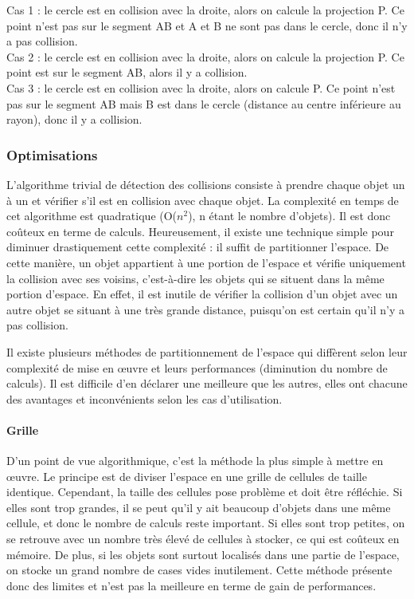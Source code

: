 \documentclass{report}
\begin{document}
Cas 1 : le cercle est en collision avec la droite, alors on calcule la projection P. Ce point n’est pas sur le segment AB et A et B ne sont pas dans le cercle, donc il n’y a pas collision. \\

Cas 2 : le cercle est en collision avec la droite, alors on calcule la projection P. Ce point est sur le segment AB, alors il y a collision. \\

Cas 3 : le cercle est en collision avec la droite, alors on calcule P. Ce point n’est pas sur le segment AB mais B est dans le cercle (distance au centre inférieure au rayon), donc il y a collision.

\subsubsection{Optimisations}

L’algorithme trivial de détection des collisions consiste à prendre chaque objet un à un et vérifier s’il est en collision avec chaque objet. La complexité en temps de cet algorithme est quadratique (O($n^2$), n étant le nombre d’objets). Il est donc coûteux en terme de calculs. Heureusement, il existe une technique simple pour diminuer drastiquement cette complexité : il suffit de partitionner l’espace. De cette manière, un objet appartient à une portion de l’espace et vérifie uniquement la collision avec ses voisins, c’est-à-dire les objets qui se situent dans la même portion d’espace. En effet, il est inutile de vérifier la collision d’un objet avec un autre objet se situant à une très grande distance, puisqu’on est certain qu’il n’y a pas collision.

Il existe plusieurs méthodes de partitionnement de l’espace \cite{06} qui diffèrent selon leur complexité de mise en œuvre et leurs performances (diminution du nombre de calculs). Il est difficile d’en déclarer une meilleure que les autres, elles ont chacune des avantages et inconvénients selon les cas d’utilisation.

\newpage
\paragraph{Grille}

D’un point de vue algorithmique, c’est la méthode la plus simple à mettre en œuvre.
Le principe est de diviser l’espace en une grille de cellules de taille identique. Cependant, la taille des cellules pose problème et doit être réfléchie. Si elles sont trop grandes, il se peut qu’il y ait beaucoup d’objets dans une même cellule, et donc le nombre de calculs reste important. Si elles sont trop petites, on se retrouve avec un nombre très élevé de cellules à stocker, ce qui est coûteux en mémoire. De plus, si les objets sont surtout localisés dans une partie de l’espace, on stocke un grand nombre de cases vides inutilement. Cette méthode présente donc des limites et n’est pas la meilleure en terme de gain de performances. \\
\end{document}
